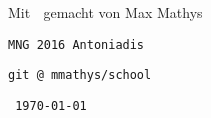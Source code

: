 {\Large Mit 💖 gemacht von Max Mathys 👊}

\vspace{.7em}

\texttt{MNG 2016 Antoniadis}
\vspace{.5em}

\texttt{git @ mmathys/school}
	
\texttt{\currenttime\ \today}